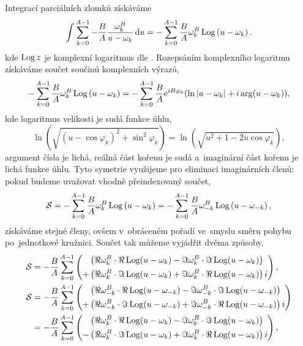 Integrací parciálních zlomků získáváme
\begin{equation}
    \int \sum_{k=0}^{A-1}-\frac{B}{A}\frac{\omega_k^{B}}{u-\omega_k} \,\mathrm{d}{u}
    =-\sum_{k=0}^{A-1}\frac{B}{A}\omega_k^{B}\operatorname{Log}\left(u-\omega_k\right).
\end{equation}
kde $\operatorname{Log}{z}$ je komplexní logaritmus dle . Rozepsáním komplexního logaritmu získáváme součet součinů komplexních výrazů,
\begin{equation}
    -\sum_{k=0}^{A-1}\frac{B}{A}\omega_k^{B}\operatorname{Log}\left(u-\omega_k\right)
    =-\sum_{k=0}^{A-1}\frac{B}{A}\mathrm{e}^{iB\varphi_k}(\ln\left\lvert u-\omega_k\right\rvert+i\arg(u-\omega_k)),
\end{equation}
kde logaritmus velikosti je sudá funkce úhlu,
\begin{equation}
    \ln\!\left(\sqrt{(u-\cos{\varphi_k})^2+\sin^2 \varphi_k}\right)=\ln\!\left(\sqrt{u^2+1-2u\cos\varphi_k}\right),
\end{equation}
argument čísla je lichá, reálná část kořenu je sudá a~imaginární část kořenu je lichá funkce úhlu. Tyto symetrie využijeme pro eliminaci imaginárních členů: pokud budeme uvažovat vhodně přeindexovaný součet,
\begin{equation}
    \mathcal{S}=-\sum_{k=0}^{A-1}\frac{B}{A}\omega_k^{B}\operatorname{Log}\left(u-\omega_k\right)=-\sum_{k=0}^{A-1}\frac{B}{A}\omega_{-k}^{B}\operatorname{Log}\left(u-\omega_{-k}\right),
\end{equation}
získáváme stejné členy, ovšem v~obráceném pořadí ve~smyslu směru pohybu po~jednotkové kružnici. Součet tak můžeme vyjádřit dvěma způsoby,
\begin{subequations} 
    \begin{align}
        \mathcal{S}&=-\frac{B}{A}\sum_{k=0}^{A-1}
        \left(\begin{aligned}&\left(\Re\omega_{k}^B\cdot\Re\operatorname{Log}(u-\omega_{k})-\Im\omega_{k}^{B}\cdot\Im\operatorname{Log}(u-\omega_{k})\right)\\
            +&\left(\Re\omega_{k}^B\cdot\Im\operatorname{Log}(u-\omega_{k})+\Im\omega_{k}^{B}\cdot\Re\operatorname{Log}(u-\omega_{k})\right)i
        \end{aligned}\right),\\
        \mathcal{S}&=-\frac{B}{A}\sum_{k=0}^{A-1}
        \left(\begin{aligned}&\left(\Re\omega_{-k}^B\cdot\Re\operatorname{Log}(u-\omega_{-k})-\Im\omega_{-k}^{B}\cdot\Im\operatorname{Log}(u-\omega_{-k})\right)\\
            +&\left(\Re\omega_{-k}^B\cdot\Im\operatorname{Log}(u-\omega_{-k})+\Im\omega_{-k}^{B}\cdot\Re\operatorname{Log}(u-\omega_{-k})\right)i
        \end{aligned}\right)\nonumber\\
        &=-\frac{B}{A}\sum_{k=0}^{A-1}
        \left(\begin{aligned} &\left(\Re\omega_{k}^B\cdot\Re\operatorname{Log}(u-\omega_{k})-\Im\omega_{k}^{B}\cdot\Im\operatorname{Log}(u-\omega_{k})\right)\\
            -&\left(\Re\omega_{k}^B\cdot\Im\operatorname{Log}(u-\omega_{k})+\Im\omega_{k}^{B}\cdot\Re\operatorname{Log}(u-\omega_{k})\right)i
        \end{aligned}\right),
    \end{align}
\end{subequations}
